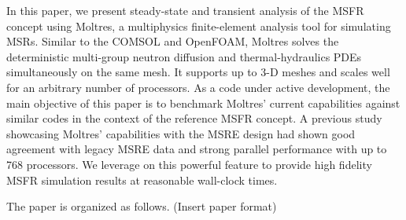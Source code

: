 In this paper, we present steady-state and transient analysis of the
\gls{MSFR} concept using Moltres, a multiphysics finite-element analysis tool
for simulating \glspl{MSR}. Similar to the COMSOL and OpenFOAM, Moltres
solves the deterministic multi-group neutron diffusion and thermal-hydraulics
\glspl{PDE} simultaneously on the same mesh. It supports up to 3-D meshes and
scales well for an arbitrary number of processors. As a code under active
development, the main objective of this paper is to benchmark Moltres' current
capabilities against similar codes in the context of the reference
\gls{MSFR} concept. A previous study showcasing Moltres' capabilities with
the \gls{MSRE} design had shown good agreement with legacy
\gls{MSRE} data and strong parallel performance with up to 768 processors.
We leverage on this powerful feature to provide high fidelity \gls{MSFR}
simulation results at reasonable wall-clock times.

The paper is organized as follows. (Insert paper format)
